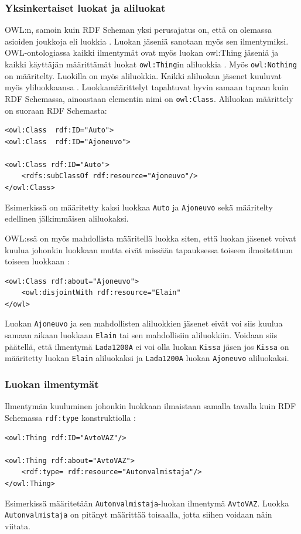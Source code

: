\documentclass[finnish]{tktltiki2}
\theoremstyle{definition}
\theoremstyle{remark}
\begin{document}
\subsubsection{Yksinkertaiset luokat ja aliluokat}
OWL:n, samoin kuin RDF Scheman yksi perusajatus on, että on olemassa asioiden joukkoja eli luokkia \cite{SWM04}. Luokan jäseniä sanotaan myös sen ilmentymiksi. OWL-ontologiassa kaikki ilmentymät ovat myös luokan owl:Thing jäseniä ja kaikki käyttäjän määrittämät luokat \texttt{owl:Thing}in aliluokkia \cite{SWM04}. Myös \texttt{owl:Nothing} on määritelty. Luokilla on myös aliluokkia. Kaikki aliluokan jäsenet kuuluvat myös yliluokkaansa \cite{SWM04}. Luokkamäärittelyt tapahtuvat hyvin samaan tapaan kuin RDF Schemassa, ainoastaan elementin nimi on \texttt{owl:Class}. Aliluokan määrittely on suoraan RDF Schemasta:
\begin{verbatim}
<owl:Class  rdf:ID="Auto">
<owl:Class  rdf:ID="Ajoneuvo">

<owl:Class rdf:ID="Auto">
    <rdfs:subClassOf rdf:resource="Ajoneuvo"/>
</owl:Class>
\end{verbatim}
Esimerkissä on määritetty kaksi luokkaa \texttt{Auto} ja \texttt{Ajoneuvo} sekä määritelty edellinen jälkimmäisen aliluokaksi. 

OWL:ssä on myös mahdollista määritellä luokka siten, että luokan jäsenet voivat kuulua johonkin luokkaan mutta eivät missään tapauksessa toiseen ilmoitettuun toiseen luokkaan \cite{SWM04}:
\begin{verbatim}
<owl:Class rdf:about="Ajoneuvo">
    <owl:disjointWith rdf:resource="Elain"
</owl>
\end{verbatim}
Luokan \texttt{Ajoneuvo} ja sen mahdollisten aliluokkien jäsenet eivät voi siis kuulua samaan aikaan luokkaan \texttt{Elain} tai sen mahdollisiin aliluokkiin. Voidaan siis päätellä, että ilmentymä \texttt{Lada1200A} ei voi olla luokan \texttt{Kissa} jäsen jos \texttt{Kissa} on määritetty luokan \texttt{Elain} aliluokaksi ja \texttt{Lada1200A} luokan \texttt{Ajoneuvo} aliluokaksi. 

\subsubsection{Luokan ilmentymät}
Ilmentymän kuuluminen johonkin luokkaan ilmaistaan samalla tavalla kuin RDF Schemassa \texttt{rdf:type} konstruktiolla \cite{SWM04}:
\begin{verbatim}
<owl:Thing rdf:ID="AvtoVAZ"/>

<owl:Thing rdf:about="AvtoVAZ">
    <rdf:type= rdf:resource="Autonvalmistaja"/>
</owl:Thing>
\end{verbatim} 
Esimerkissä määritetään \texttt{Autonvalmistaja}-luokan ilmentymä \texttt{AvtoVAZ}. Luokka \texttt{Autonvalmistaja} on pitänyt määrittää toisaalla, jotta siihen voidaan näin viitata. 
\end{document}
